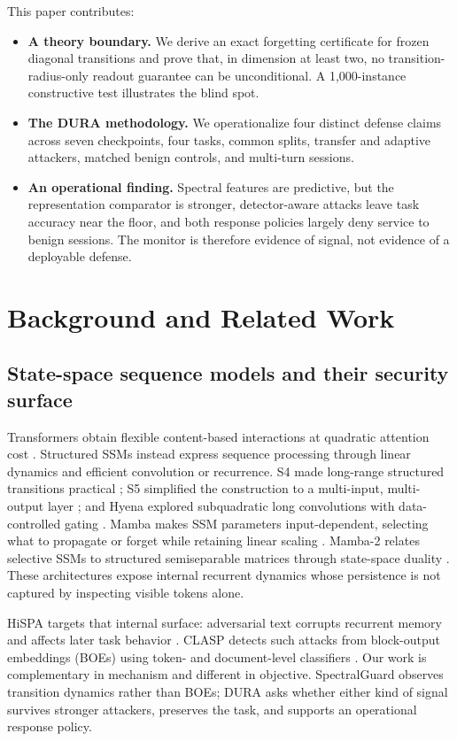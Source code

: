\documentclass[sigconf]{acmart}
\begin{document}
This paper contributes:
\begin{itemize}
  \item \textbf{A theory boundary.} We derive an exact forgetting certificate
  for frozen diagonal transitions and prove that, in dimension at least two,
  no transition-radius-only readout guarantee can be unconditional. A
  1,000-instance constructive test illustrates the blind spot.
  \item \textbf{The DURA methodology.} We operationalize four distinct defense
  claims across seven checkpoints, four tasks, common splits, transfer and
  adaptive attackers, matched benign controls, and multi-turn sessions.
  \item \textbf{An operational finding.} Spectral features are predictive, but
  the representation comparator is stronger, detector-aware attacks leave task
  accuracy near the floor, and both response policies largely deny service to
  benign sessions. The monitor is therefore evidence of signal, not evidence
  of a deployable defense.
\end{itemize}

\section{Background and Related Work}
\subsection{State-space sequence models and their security surface}
Transformers obtain flexible content-based interactions at quadratic attention
cost \cite{vaswani2017attention}. Structured SSMs instead express sequence
processing through linear dynamics and efficient convolution or recurrence.
S4 made long-range structured transitions practical
\cite{gu2022s4}; S5 simplified the construction to a multi-input,
multi-output layer \cite{smith2023s5}; and Hyena explored subquadratic long
convolutions with data-controlled gating \cite{poli2023hyena}. Mamba makes
SSM parameters input-dependent, selecting what to propagate or forget while
retaining linear scaling \cite{gu2024mamba}. Mamba-2 relates selective SSMs
to structured semiseparable matrices through state-space duality
\cite{dao2024mamba2}. These architectures expose internal recurrent dynamics
whose persistence is not captured by inspecting visible tokens alone.

HiSPA targets that internal surface: adversarial text corrupts recurrent memory
and affects later task behavior \cite{lemercier2026hispa}. CLASP detects such
attacks from block-output embeddings (BOEs) using token- and document-level
classifiers \cite{lemercier2026clasp}. Our work is complementary in mechanism
and different in objective. SpectralGuard observes transition dynamics rather
than BOEs; DURA asks whether either kind of signal survives stronger attackers,
preserves the task, and supports an operational response policy.
\end{document}
